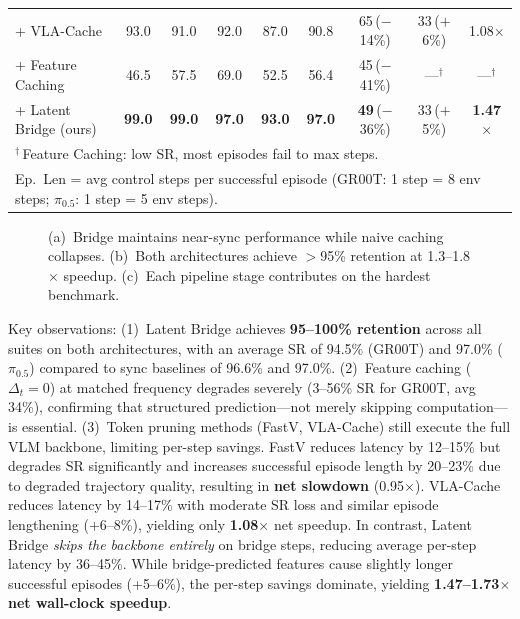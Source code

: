 \documentclass{article}
\begin{document}
\begin{table}[t]
{\begin{tabular}{l|cccc|c|ccc}
+ VLA-Cache              & 93.0 & 91.0 & 92.0 & 87.0 & 90.8 & 65\,{\scriptsize($-$14\%)} & 33\,{\scriptsize($+$6\%)}  & 1.08$\times$ \\
+ Feature Caching        & 46.5 & 57.5 & 69.0 & 52.5 & 56.4 & 45\,{\scriptsize($-$41\%)} & ---$^\dagger$  & ---$^\dagger$ \\
+ Latent Bridge (ours)   & \textbf{99.0} & \textbf{99.0} & \textbf{97.0} & \textbf{93.0} & \textbf{97.0} & \textbf{49}\,{\scriptsize($-$36\%)} & 33\,{\scriptsize($+$5\%)} & \textbf{1.47$\times$} \\
\bottomrule
\multicolumn{9}{l}{\scriptsize $^\dagger$\,Feature Caching: low SR, most episodes fail to max steps.} \\
\multicolumn{9}{l}{\scriptsize Ep.\ Len = avg control steps per successful episode (GR00T: 1 step = 8 env steps; $\pi_{0.5}$: 1 step = 5 env steps).}
\end{tabular}%
}
\end{table}

\begin{figure}[t]
\centering
{}
\caption{(a)~Bridge maintains near-sync performance while naive caching collapses. (b)~Both architectures achieve $>$95\% retention at 1.3--1.8$\times$ speedup. (c)~Each pipeline stage contributes on the hardest benchmark.}
\label{fig:results}
\end{figure}

Key observations:
(1)~Latent Bridge achieves \textbf{95--100\% retention} across all suites on both architectures, with an average SR of 94.5\% (GR00T) and 97.0\% ($\pi_{0.5}$) compared to sync baselines of 96.6\% and 97.0\%.
(2)~Feature caching ($\Delta_t{=}0$) at matched frequency degrades severely (3--56\% SR for GR00T, avg 34\%), confirming that structured prediction---not merely skipping computation---is essential.
(3)~Token pruning methods (FastV, VLA-Cache) still execute the full VLM backbone, limiting per-step savings. FastV reduces latency by 12--15\% but degrades SR significantly and increases successful episode length by 20--23\% due to degraded trajectory quality, resulting in \textbf{net slowdown} (0.95$\times$). VLA-Cache reduces latency by 14--17\% with moderate SR loss and similar episode lengthening (+6--8\%), yielding only \textbf{1.08$\times$} net speedup.
In contrast, Latent Bridge \emph{skips the backbone entirely} on bridge steps, reducing average per-step latency by 36--45\%. While bridge-predicted features cause slightly longer successful episodes (+5--6\%), the per-step savings dominate, yielding \textbf{1.47--1.73$\times$ net wall-clock speedup}.
\end{document}
